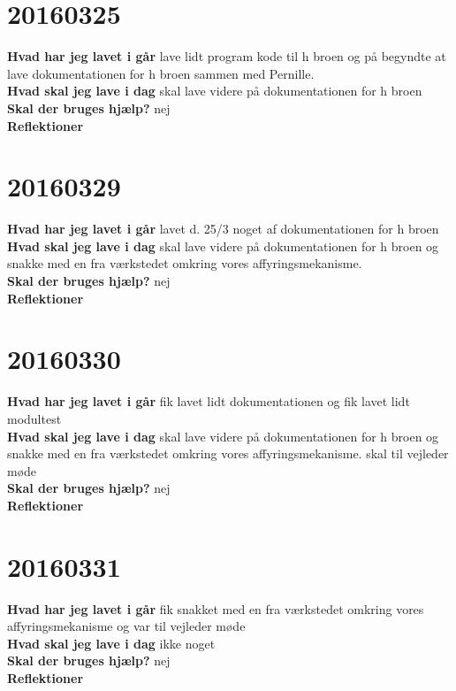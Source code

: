 \documentclass{article}
\begin{document}
					\section{20160325}
					
					\textbf{Hvad har jeg lavet i går}
					lave lidt program kode til h broen og på begyndte at lave dokumentationen for h broen sammen med Pernille. 
					\\
					\textbf{Hvad skal jeg lave i dag}
					skal lave videre på dokumentationen for h broen  
					\\
					\textbf{Skal der bruges hjælp?}
					nej
					\\
					\textbf{Reflektioner}
					
	\section{20160329}
	
	\textbf{Hvad har jeg lavet i går}
	lavet d. 25/3 noget af dokumentationen for h broen  
	\\
	\textbf{Hvad skal jeg lave i dag}
	skal lave videre på dokumentationen for h broen og snakke med en fra værkstedet omkring vores affyringsmekanisme.  
	\\
	\textbf{Skal der bruges hjælp?}
	nej
	\\
	\textbf{Reflektioner}
	
		\section{20160330}
		
		\textbf{Hvad har jeg lavet i går}
		fik lavet lidt dokumentationen og fik lavet lidt modultest
		\\
		\textbf{Hvad skal jeg lave i dag}
		skal lave videre på dokumentationen for h broen og snakke med en fra værkstedet omkring vores affyringsmekanisme. skal til vejleder møde 
		\\
		\textbf{Skal der bruges hjælp?}
		nej
		\\
		\textbf{Reflektioner}
			\section{20160331}
			
			\textbf{Hvad har jeg lavet i går}
			fik snakket med en fra værkstedet omkring vores affyringsmekanisme og var til vejleder møde 
			\\
			\textbf{Hvad skal jeg lave i dag}
			ikke noget
			\\
			\textbf{Skal der bruges hjælp?}
			nej
			\\
			\textbf{Reflektioner}
\end{document}
